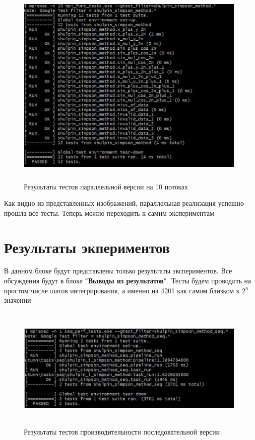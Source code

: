 \documentclass[12pt,a4paper]{article}
\begin{document}
\begin{figure}[H]
\centering
\includegraphics[height=10cm]{img/10nmpitest.jpg}
\caption{\label{fig:visualClass} Результаты тестов параллельной версии на 10 потоках}
\end{figure}

Как видно из представленных изображений, параллельная реализация успешно прошла все тесты. Теперь можно переходить к самим экспериментам

\section*{Результаты экпериментов}

В данном блоке будут представлены только результаты экспериментов. Все обсуждения будут в блоке \textbf{"Выводы из результатов"}. Тесты будем проводить на простом числе шагов интегрирования, а именно на 4201 как самом близком к \(2^n\) значении

\begin{figure}[H]
\centering
\includegraphics[height=6cm]{img/1nseqperftest.jpg}
\caption{\label{fig:visualClass} Результаты тестов производительности последовательной версии}
\end{figure}
\end{document}
